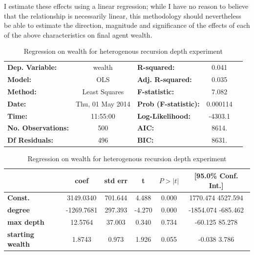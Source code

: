 \documentclass{article}
\begin{document}
I estimate these effects using a linear regression; while I have no reason to believe that the relationship is necessarily linear, this methodology should nevertheless be able to estimate the direction, magnitude and significance of the effects of each of the above characteristics on final agent wealth. 

\begin{table}
\begin{tabular}{lclcl}
\toprule
\textbf{Dep. Variable:}    &      wealth      & \textbf{  R-squared:         } &     0.041   \\
\textbf{Model:}            &       OLS        & \textbf{  Adj. R-squared:    } &     0.035   \\
\textbf{Method:}           &  Least Squares   & \textbf{  F-statistic:       } &     7.082   \\
\textbf{Date:}             & Thu, 01 May 2014 & \textbf{  Prob (F-statistic):} &  0.000114   \\
\textbf{Time:}             &     11:55:00     & \textbf{  Log-Likelihood:    } &   -4303.1   \\
\textbf{No. Observations:} &         500      & \textbf{  AIC:               } &     8614.   \\
\textbf{Df Residuals:}     &         496      & \textbf{  BIC:               } &     8631.   \\
\bottomrule
\end{tabular}

\begin{tabular}{lccccc}
\toprule
                         & \textbf{coef} & \textbf{std err} & \textbf{t} & \textbf{$P>|t|$} & \textbf{[95.0\% Conf. Int.]}  \\
\midrule
\textbf{Const.}          &    3149.0340  &      701.644     &     4.488  &      0.000     &      1770.474  4527.594      \\
\textbf{degree}          &   -1269.7681  &      297.393     &    -4.270  &      0.000     &     -1854.074  -685.462      \\
\textbf{max depth}       &      12.5764  &       37.003     &     0.340  &      0.734     &       -60.125    85.278      \\
\textbf{starting wealth} &       1.8743  &        0.973     &     1.926  &      0.055     &        -0.038     3.786      \\
\bottomrule
\end{tabular}
\caption{Regression on wealth for heterogenous recursion depth experiment}
\end{table}
\end{document}

